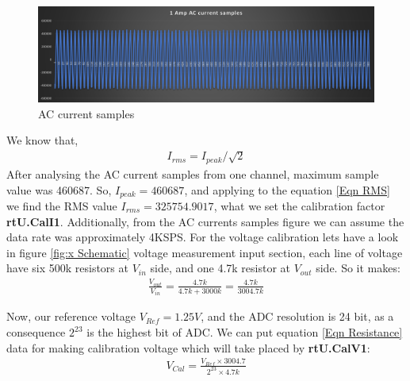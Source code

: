 \begin{figure}[htbp]
\centering
\includegraphics[scale=0.4]{images/AC_Current.png}
\caption{AC current samples}
\label{fig:x AC Current}
\end{figure}
We know that, 
\begin{align}\label{Eqn RMS}
I_{rms} = I_{peak} / \sqrt{2}
\end{align}
After analysing the AC current samples from one channel, maximum sample value was 460687. So, $I_{peak}=460687$, and applying to the equation \ref{Eqn RMS} we find the RMS value $I_{rms}=325754.9017$, what we set the calibration factor \textbf{rtU.CalI1}. Additionally, from the AC currents samples figure we can assume the data rate was approximately 4KSPS. For the voltage calibration lets have a look in figure \ref{fig:x Schematic} voltage measurement input section, each line of voltage have six 500k resistors at $V_{in}$ side, and one 4.7k resistor at $V_{out}$ side. So it makes:
\begin{align}\label{Eqn Resistance}
\frac{V_{out}}{V_{in}}=\frac{4.7k}{4.7k+3000k}=\frac{4.7k}{3004.7k}
\end{align}

Now, our reference voltage $V_{Ref}= 1.25V$, and the ADC resolution is 24 bit, as a consequence $2^{23}$ is the highest bit of ADC. We can put equation \ref{Eqn Resistance} data for making calibration voltage which will take placed by \textbf{rtU.CalV1}: 
\begin{align}\label{Eqn Cal}
V_{Cal}=\frac{V_{Ref}\times3004.7}{2^{23}\times 4.7k}
\end{align}


